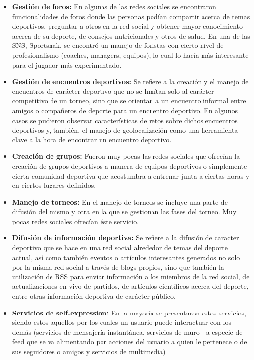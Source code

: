 \begin{itemize}
	\item \textbf{Gestión de foros:} En algunas de las redes sociales se encontraron funcionalidades de foros donde las personas podían compartir acerca de temas deportivos, preguntar a otros en la red social y obtener mayor conocimiento acerca de su deporte, de consejos nutricionales y otros de salud. En una de las SNS, Sportsnak, se encontró un manejo de foristas con cierto nivel de profesionalismo (coaches, managers, equipos), lo cual lo hacía más interesante para el jugador más experimentado.
	\item \textbf{Gestión de encuentros deportivos:} Se refiere a la creación y el manejo de encuentros de carácter deportivo que no se limítan solo al carácter competitivo de un torneo, sino que se orientan a un encuentro informal entre amigos o compañeros de deporte para un encuentro deportivo. En algunos casos se pudieron observar características de retos sobre dichos encuentros deportivos y, también, el manejo de geolocalización como una herramienta clave a la hora de encontrar un encuentro deportivo.
	\item \textbf{Creación de grupos:} Fueron muy pocas las redes sociales que ofrecían la creación de grupos deportivos a manera de equipos deportivos o simplemente cierta comunidad deportiva que acostumbra a entrenar junta a ciertas horas y en ciertos lugares definidos.
	\item \textbf{Manejo de torneos:} En el manejo de torneos se incluye una parte de difusión del mismo y otra en la que se gestionan las fases del torneo. Muy pocas redes sociales ofrecían éste servicio.
	\item \textbf{Difusión de información deportiva:} Se refiere a la difusión de caracter deportivo que se hace en una red social alrededor de temas del deporte actual, así como también eventos o artículos interesantes generados no solo por la misma red social a través de blogs propios, sino que también la utilización de RSS para enviar información a los miembros de la red social, de actualizaciones en vivo de partidos, de artículos científicos acerca del deporte, entre otras información deportiva de carácter público.
	\item \textbf{Servicios de self-expression:} En la mayoría se presentaron estos servicios, siendo estos aquellos por los cuales un usuario puede interactuar con los demás (servicios de mensajería instantánea, servicios de muro - a especie de feed que se va alimentando por acciones del usuario a quien le pertenece o de sus seguidores o amigos y servicios de multimedia)

\end{itemize}
